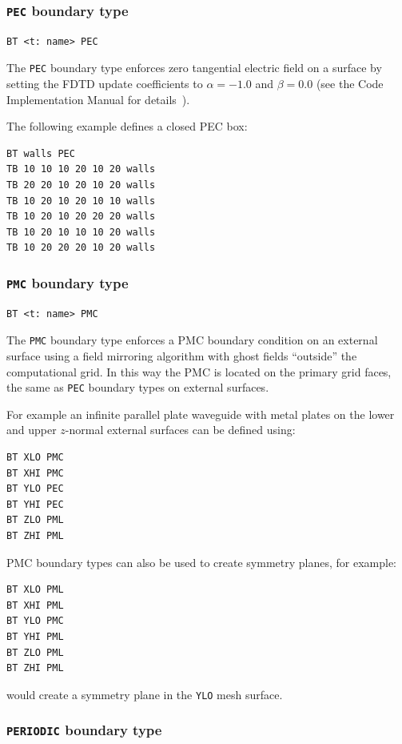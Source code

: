 \documentclass[onecolumn,a4paper]{article}
\numberwithin{equation}{section}
\begin{document}
\subsubsection{\texttt{PEC} boundary type}

\begin{verbatim}
BT <t: name> PEC
\end{verbatim}

The \texttt{PEC} boundary type enforces zero tangential electric field on a surface
by setting the FDTD update coefficients to $\alpha=-1.0$ and $\beta=0.0$
(see the Code Implementation Manual for details~\cite{vultimp}).

The following example defines a closed PEC box: 
\begin{verbatim}
BT walls PEC 
TB 10 10 10 20 10 20 walls
TB 20 20 10 20 10 20 walls
TB 10 20 10 20 10 10 walls
TB 10 20 10 20 20 20 walls
TB 10 20 10 10 10 20 walls
TB 10 20 20 20 10 20 walls
\end{verbatim}

\subsubsection{\texttt{PMC} boundary type}

\begin{verbatim}
BT <t: name> PMC
\end{verbatim}

The \texttt{PMC} boundary type enforces a PMC boundary condition on an external
surface using a field mirroring algorithm with ghost fields ``outside'' the computational
grid. In this way the PMC is located on the primary grid faces, the same as \texttt{PEC}
boundary types on external surfaces.

For example an infinite parallel plate waveguide with metal plates on the lower and upper
$z$-normal external surfaces can be defined using:
\begin{verbatim}
BT XLO PMC
BT XHI PMC
BT YLO PEC
BT YHI PEC
BT ZLO PML
BT ZHI PML
\end{verbatim}

PMC boundary types can also be used to create symmetry planes, for example:
\begin{verbatim}
BT XLO PML
BT XHI PML
BT YLO PMC
BT YHI PML
BT ZLO PML
BT ZHI PML
\end{verbatim}
would create a symmetry plane in the \texttt{YLO} mesh surface.

\subsubsection{\texttt{PERIODIC} boundary type}
\end{document}
